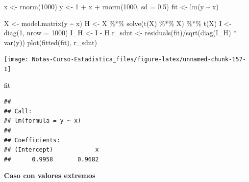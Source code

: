 \documentclass[
  12pt,
]{book}
\newenvironment{Shaded}{\begin{snugshade}}{\end{snugshade}}
\newcommand{\AttributeTok}[1]{\textcolor[rgb]{0.77,0.63,0.00}{#1}}
\newcommand{\DecValTok}[1]{\textcolor[rgb]{0.00,0.00,0.81}{#1}}
\newcommand{\FloatTok}[1]{\textcolor[rgb]{0.00,0.00,0.81}{#1}}
\newcommand{\FunctionTok}[1]{\textcolor[rgb]{0.00,0.00,0.00}{#1}}
\newcommand{\NormalTok}[1]{#1}
\newcommand{\OtherTok}[1]{\textcolor[rgb]{0.56,0.35,0.01}{#1}}
\newcommand{\SpecialCharTok}[1]{\textcolor[rgb]{0.00,0.00,0.00}{#1}}
\begin{document}
\begin{Shaded}
\begin{Highlighting}[]
\NormalTok{x }\OtherTok{\textless{}{-}} \FunctionTok{rnorm}\NormalTok{(}\DecValTok{1000}\NormalTok{)}
\NormalTok{y }\OtherTok{\textless{}{-}} \DecValTok{1} \SpecialCharTok{+}\NormalTok{ x }\SpecialCharTok{+} \FunctionTok{rnorm}\NormalTok{(}\DecValTok{1000}\NormalTok{, }\AttributeTok{sd =} \FloatTok{0.5}\NormalTok{)}
\NormalTok{fit }\OtherTok{\textless{}{-}} \FunctionTok{lm}\NormalTok{(y }\SpecialCharTok{\textasciitilde{}}\NormalTok{ x)}

\NormalTok{X }\OtherTok{\textless{}{-}} \FunctionTok{model.matrix}\NormalTok{(y }\SpecialCharTok{\textasciitilde{}}\NormalTok{ x)}
\NormalTok{H }\OtherTok{\textless{}{-}}\NormalTok{ X }\SpecialCharTok{\%*\%} \FunctionTok{solve}\NormalTok{(}\FunctionTok{t}\NormalTok{(X) }\SpecialCharTok{\%*\%}\NormalTok{ X) }\SpecialCharTok{\%*\%} \FunctionTok{t}\NormalTok{(X)}
\NormalTok{I }\OtherTok{\textless{}{-}} \FunctionTok{diag}\NormalTok{(}\DecValTok{1}\NormalTok{, }\AttributeTok{nrow =} \DecValTok{1000}\NormalTok{)}
\NormalTok{I\_H }\OtherTok{\textless{}{-}}\NormalTok{ I }\SpecialCharTok{{-}}\NormalTok{ H}
\NormalTok{r\_sdnt }\OtherTok{\textless{}{-}} \FunctionTok{residuals}\NormalTok{(fit)}\SpecialCharTok{/}\FunctionTok{sqrt}\NormalTok{(}\FunctionTok{diag}\NormalTok{(I\_H) }\SpecialCharTok{*} \FunctionTok{var}\NormalTok{(y))}
\FunctionTok{plot}\NormalTok{(}\FunctionTok{fitted}\NormalTok{(fit), r\_sdnt)}
\end{Highlighting}
\end{Shaded}

\begin{center}\texttt{[image: Notas-Curso-Estadistica\_files/figure-latex/unnamed-chunk-157-1]} \end{center}

\begin{Shaded}
\begin{Highlighting}[]
\NormalTok{fit}
\end{Highlighting}
\end{Shaded}

\begin{verbatim}
## 
## Call:
## lm(formula = y ~ x)
## 
## Coefficients:
## (Intercept)            x  
##      0.9958       0.9682
\end{verbatim}

\textbf{Caso con valores extremos}
\end{document}
